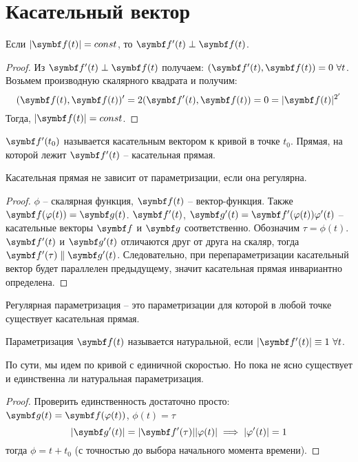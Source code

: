 \documentclass[main]{subfiles}
\begin{document}
\chapter{Касательный вектор}
\begin{lemma}\label{dfoc:very_important_lemma}
    Если $|\vf(t)| = const$, то $\vf'(t) \perp \vf(t)$.
\end{lemma}
\begin{proof}
    Из $\vf'(t) \perp \vf(t)$ получаем: $ (\vf'(t), \vf(t)) = 0\ \forall t$.
    Возьмем производную скалярного квадрата и получим:
    \[(\vf(t), \vf(t))' = 2(\vf'(t), \vf(t)) = 0 = |\vf(t)|^{2'}\]
    Тогда, $|\vf(t)| = const$.
\end{proof}
\begin{definition}
    $\vf'(t_0)$ называется касательным вектором к кривой в точке $t_0$.
    Прямая, на которой лежит $\vf'(t)$ -- касательная прямая.
\end{definition}
\begin{theorem}
    Касательная прямая не зависит от параметризации, если она регулярна.
\end{theorem}
\begin{proof}
    $\phi$ -- скалярная функция, $\vf(t)$ -- вектор-функция.
    Также $\vf(\phi(t)) = \vg(t)$.
    $\vf'(t)$, $\vg'(t) = \vf'(\phi(t)) \phi'(t)$ -- касательные векторы $\vf$ и $\vg$ соответственно.
    Обозначим $\tau = \phi(t)$.
    $\vf'(t)$ и $\vg'(t)$ отличаются друг от друга на скаляр,
    тогда $\vf'(\tau) \parallel \vg'(t)$.
    Следовательно, при перепараметризации касательный вектор будет параллелен предыдущему, значит касательная прямая инвариантно определена.
\end{proof}
\begin{remark}
    Регулярная параметризация -- это параметризации для которой в любой точке существует касательная прямая.
\end{remark}
\begin{definition}
    Параметризация $\vf(t)$ называется натуральной, если $|\vf'(t)| \equiv 1\ \forall t$.
\end{definition}
По сути, мы идем по кривой с единичной скоростью.
Но пока не ясно существует и единственна ли натуральная параметризация.
\begin{proof}
    Проверить единственность достаточно просто: $\vg(t) = \vf(\phi(t))$, $\phi(t) = \tau$
    \[|\vg'(t)| = |\vf'(\tau)| |\phi(t)| \implies |\phi'(t)| = 1\]
    тогда $\phi = t + t_0$ (с точностью до выбора начального момента времени).
\end{proof}
\end{document}
